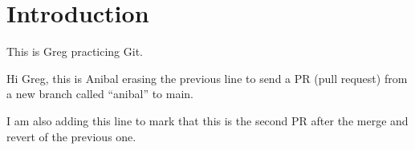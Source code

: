 
\section{Introduction} \label{s:introduction}

This is Greg practicing Git.

Hi Greg, this is Anibal erasing the previous line to send a PR (pull request) from a new branch called ``anibal'' to main.

I am also adding this line to mark that this is the second PR after the merge and revert of the previous one.